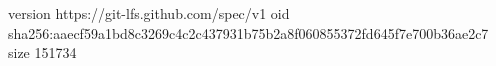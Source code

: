 version https://git-lfs.github.com/spec/v1
oid sha256:aaecf59a1bd8c3269c4c2c437931b75b2a8f060855372fd645f7e700b36ae2c7
size 151734
